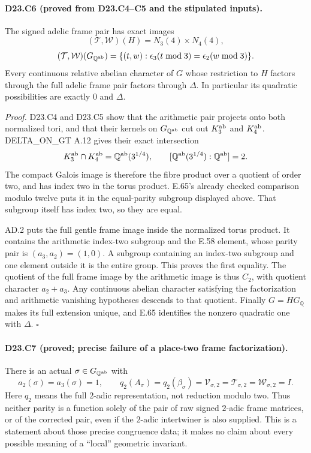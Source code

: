 \paragraph{D23.C6 (proved from D23.C4--C5 and the stipulated inputs).}
The signed adelic frame pair has exact images
\[
 (\mathcal T,\mathcal W)(H)=N_3(4)\times N_4(4),
\]
\[
 (\mathcal T,\mathcal W)(G_{\mathbb Q^{\rm ab}})
 =\{(t,w):\epsilon_3(t\bmod3)=\epsilon_2(w\bmod3)\}.
\]
Every continuous relative abelian character of $G$ whose
restriction to $H$ factors through the full adelic frame pair
factors through $\Delta$.  In particular its quadratic possibilities
are exactly $0$ and $\Delta$.

\emph{Proof.}
D23.C4 and D23.C5 show that the arithmetic pair projects onto
both normalized tori, and that their kernels on
$G_{\mathbb Q^{\rm ab}}$ cut out $K_3^{\rm ab}$ and
$K_4^{\rm ab}$.  DELTA\_ON\_GT A.12 gives their exact
intersection
\[
 K_3^{\rm ab}\cap K_4^{\rm ab}
       =\mathbb Q^{\rm ab}(3^{1/4}),
 \qquad [\mathbb Q^{\rm ab}(3^{1/4}):\mathbb Q^{\rm ab}]=2.
\]
The compact Galois image is therefore the fibre product over a
quotient of order two, and has index two in the torus product.
E.65's already checked comparison modulo twelve puts it in the
equal-parity subgroup displayed above.  That subgroup itself
has index two, so they are equal.

AD.2 puts the full gentle frame image inside the normalized torus
product.  It contains the arithmetic index-two subgroup and the
E.58 element, whose parity pair is $(a_3,a_2)=(1,0)$.
A subgroup containing an index-two subgroup and one element
outside it is the entire group.  This proves the first equality.
The quotient of the full frame image by the arithmetic image is
thus $C_2$, with quotient character $a_2+a_3$.  Any continuous
abelian character satisfying the factorization and arithmetic
vanishing hypotheses descends to that quotient.  Finally
$G=HG_{\mathbb Q}$ makes its full extension unique, and E.65
identifies the nonzero quadratic one with $\Delta$.
\hfill$\square$

\paragraph{D23.C7 (proved; precise failure of a place-two frame factorization).}
There is an actual $\sigma\in G_{\mathbb Q^{\rm ab}}$ with
\[
 a_2(\sigma)=a_3(\sigma)=1,
 \qquad
 q_2(A_\sigma)=q_2(\beta_\sigma)
     =\mathcal V_{\sigma,2}
     =\mathcal T_{\sigma,2}
     =\mathcal W_{\sigma,2}=I.
\]
Here $q_2$ means the full $2$-adic representation, not reduction
modulo two.  Thus neither parity is a function solely of the pair
of raw signed $2$-adic frame matrices, or of the corrected pair,
even if the $2$-adic intertwiner is also supplied.  This is a
statement about those precise congruence data; it makes no claim
about every possible meaning of a ``local'' geometric invariant.

